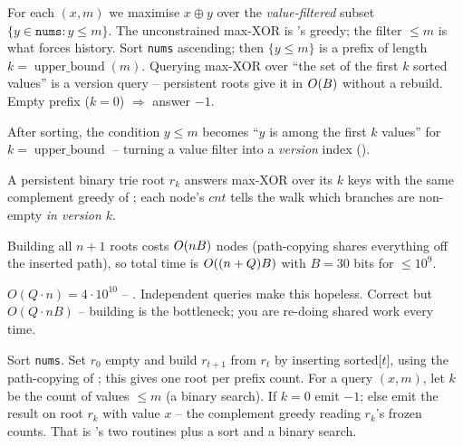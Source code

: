 For each $(x,m)$ we maximise $x\oplus y$ over the \emph{value-filtered} subset $\{y\in\texttt{nums}: y\le m\}$.
The unconstrained max-XOR is 's greedy; the filter $\le m$ is what forces history. Sort
\texttt{nums} ascending; then $\{y\le m\}$ is a prefix of length $k=\operatorname{upper\_bound}(m)$. Querying
max-XOR over ``the set of the first $k$ sorted values'' is a version query -- persistent roots give it in
$O(B)$ without a rebuild. Empty prefix ($k=0$) $\Rightarrow$ answer $-1$.

\begin{observation}
After sorting, the condition $y\le m$ becomes ``$y$ is among the first $k$ values'' for
$k=\operatorname{upper\_bound}$ -- turning a value filter into a \emph{version} index ().
\end{observation}
\begin{observation}
A persistent binary trie root $r_k$ answers max-XOR over its $k$ keys with the same complement greedy of
; each node's $\mathit{cnt}$ tells the walk which branches are non-empty \emph{in
version $k$}.
\end{observation}
\begin{observation}
Building all $n{+}1$ roots costs $O(nB)$ nodes (path-copying shares everything off the inserted path),
so total time is $O((n+Q)B)$ with $B=30$ bits for $\le 10^9$.
\end{observation}

\begin{thinkbox}
{$O(Q\cdot n)=4\cdot 10^{10}$ -- \re. Independent queries make this hopeless.}
{Correct but $O(Q\cdot n B)$ -- building is the bottleneck; you are re-doing shared work every time.}
\end{thinkbox}

Sort \texttt{nums}. Set $r_0$ empty and build $r_{t+1}$ from $r_t$ by inserting sorted[$t$], using the
path-copying  of ; this gives one root per prefix count. For a query
$(x,m)$, let $k$ be the count of values $\le m$ (a binary search). If $k=0$ emit $-1$; else emit the
 result on root $r_k$ with value $x$ -- the complement greedy reading $r_k$'s frozen counts.
That is 's two routines plus a sort and a binary search.

